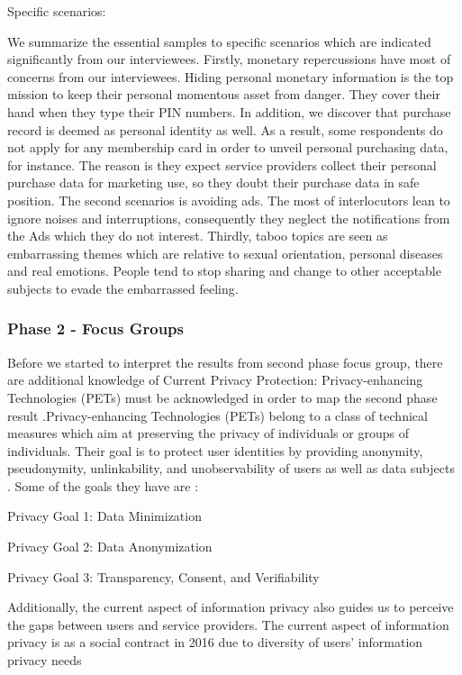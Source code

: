 Specific scenarios: 

We summarize the essential samples to specific scenarios which are indicated significantly from our interviewees. Firstly, monetary repercussions have most of concerns from our interviewees. Hiding personal monetary information is the top mission to keep their personal momentous asset from danger. They cover their hand when they type their PIN numbers. In addition, we discover that purchase record is deemed as personal identity as well. As a result, some respondents do not apply for any membership card in order to unveil personal purchasing data, for instance. The reason is they expect service providers collect their personal purchase data for marketing use, so they doubt their purchase data in safe position. The second scenarios is avoiding ads. The most of interlocutors lean to ignore noises and interruptions, consequently they neglect the notifications from the Ads which they do not interest. Thirdly, taboo topics are seen as embarrassing themes which are relative to sexual orientation, personal diseases and real emotions. People tend to stop sharing and change to other acceptable subjects to evade the embarrassed feeling. 

\subsubsection{Phase 2 - Focus Groups}
Before we started to interpret the results from second phase focus group, there are additional knowledge of Current Privacy Protection: Privacy-enhancing Technologies (PETs) must be acknowledged in order to map the second phase result .Privacy-enhancing Technologies (PETs) belong to a class of technical measures which aim at preserving the privacy of individuals or groups of individuals. Their goal is to protect user identities by providing anonymity, pseudonymity, unlinkability, and unobservability of users as well as data subjects \cite{twelve}. Some of the goals they have are \cite{priv_goals}:

Privacy Goal 1: Data Minimization 

Privacy Goal 2: Data Anonymization 

Privacy Goal 3: Transparency, Consent, and Verifiability 

Additionally, the current aspect of information privacy also guides us to perceive the gaps between users and service providers. The current aspect of information privacy is as a social contract in 2016  due to diversity of users’ information privacy needs 


